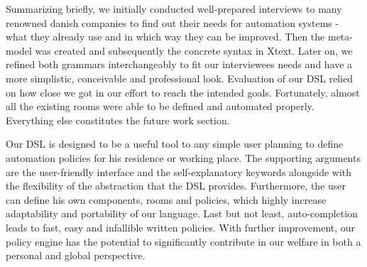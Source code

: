Summarizing briefly, we initially conducted well-prepared interviews to many renowned danish companies to find out their needs for automation systems - what they already use and in which way they can be improved. Then the meta-model was created and subsequently the concrete syntax in Xtext. Later on, we refined both grammars interchangeably to fit our interviewees needs and have a more simplistic, conceivable and professional look. Evaluation of our DSL relied on how close we got in our effort to reach the intended goals. Fortunately, almost all the existing rooms were able to be defined and automated properly. Everything else constitutes the future work section.

Our DSL is designed to be a useful tool to any simple user planning to define automation policies for his residence or working place. The supporting arguments are the user-friendly interface and the self-explanatory keywords alongside with the flexibility of the abstraction that the DSL provides. Furthermore, the user can define his own components, rooms and policies, which highly increase adaptability and portability of our language. Last but not least, auto-completion leads to fast, easy and infallible written policies. With further improvement, our policy engine has the potential to significantly contribute in our welfare in both a personal and global perspective.
